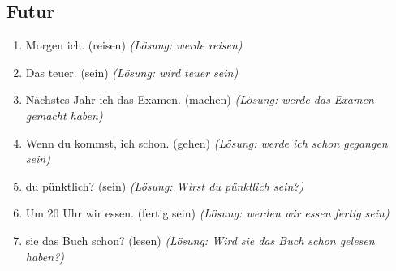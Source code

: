 \subsection{Futur}
\begin{enumerate}
    \item Morgen \underline{\hspace{1cm}} ich. (reisen) \quad \textit{(Lösung: werde reisen)}
    \item Das \underline{\hspace{1cm}} teuer. (sein) \quad \textit{(Lösung: wird teuer sein)}
    \item Nächstes Jahr \underline{\hspace{1cm}} ich das Examen. (machen) \quad \textit{(Lösung: werde das Examen gemacht haben)}
    \item Wenn du kommst, \underline{\hspace{1cm}} ich schon. (gehen) \quad \textit{(Lösung: werde ich schon gegangen sein)}
    \item \underline{\hspace{1cm}} du pünktlich? (sein) \quad \textit{(Lösung: Wirst du pünktlich sein?)}
    \item Um 20 Uhr \underline{\hspace{1cm}} wir essen. (fertig sein) \quad \textit{(Lösung: werden wir essen fertig sein)}
    \item \underline{\hspace{1cm}} sie das Buch schon? (lesen) \quad \textit{(Lösung: Wird sie das Buch schon gelesen haben?)}
\end{enumerate}

\chapterend